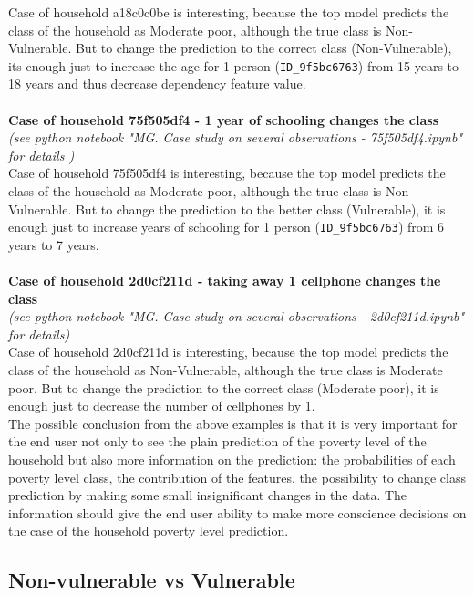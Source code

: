 Case of household a18c0c0be is interesting, because the top model predicts the class of the household as Moderate poor, although the true class is Non-Vulnerable. But to change the prediction to the correct class (Non-Vulnerable), its enough just to increase the age for 1 person (\verb|ID_9f5bc6763|) from 15 years to 18 years and thus decrease dependency feature value.\\        
    \\
\textbf{Case of household 75f505df4 - 1 year of schooling changes the class}\\
\textit{(see python notebook "MG. Case study on several observations - 75f505df4.ipynb" for details \cite{our_github})}\\

Case of household 75f505df4 is interesting, because the top model predicts the class of the household as Moderate poor, although the true class is Non-Vulnerable. But to change the prediction to the better class (Vulnerable), it is enough just to increase years of schooling for 1 person (\verb|ID_9f5bc6763|) from 6 years to 7 years.\\
\\
\textbf{Case of household 2d0cf211d - taking away 1 cellphone changes the class}\\
\textit{(see python notebook "MG. Case study on several observations - 2d0cf211d.ipynb" for details\cite{our_github})}\\

Case of household 2d0cf211d is interesting, because the top model predicts the class of the household as Non-Vulnerable, although the true class is Moderate poor. But to change the prediction to the correct class (Moderate poor), it is enough just to decrease the number of cellphones by 1.\\

The possible conclusion from the above examples is that it is very important for the end user not only to see the plain prediction of the poverty level of the household but also more information on the prediction: the probabilities of each poverty level class, the contribution of the features, the possibility to change class prediction by making some small insignificant changes in the data. The information should give the end user ability to make more conscience decisions on the case of the household poverty level prediction.

    \subsection{Non-vulnerable vs Vulnerable}
